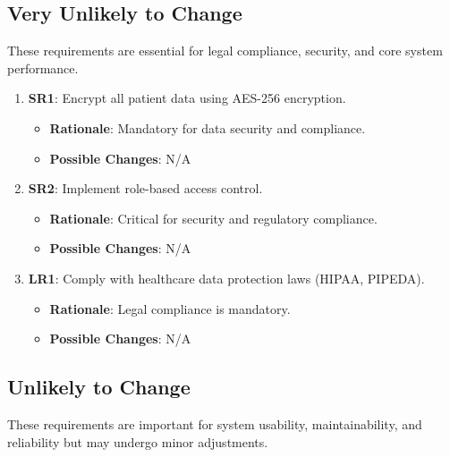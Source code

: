 \documentclass[12pt]{article}
\begin{document}
\subsection{Very Unlikely to Change}

These requirements are essential for legal compliance, security, and core system performance.

\begin{enumerate}
    \item \textbf{SR1}: Encrypt all patient data using AES-256 encryption.
    \begin{itemize}[label=-]
        \item \textbf{Rationale}: Mandatory for data security and compliance.
        \item \textbf{Possible Changes}: N/A
    \end{itemize}

    \item \textbf{SR2}: Implement role-based access control.
    \begin{itemize}[label=-]
        \item \textbf{Rationale}: Critical for security and regulatory compliance.
        \item \textbf{Possible Changes}: N/A
    \end{itemize}

    \item \textbf{LR1}: Comply with healthcare data protection laws (HIPAA, PIPEDA).
    \begin{itemize}[label=-]
        \item \textbf{Rationale}: Legal compliance is mandatory.
        \item \textbf{Possible Changes}: N/A
    \end{itemize}
\end{enumerate}

\subsection{Unlikely to Change}

These requirements are important for system usability, maintainability, and reliability but may undergo minor adjustments.
\end{document}
